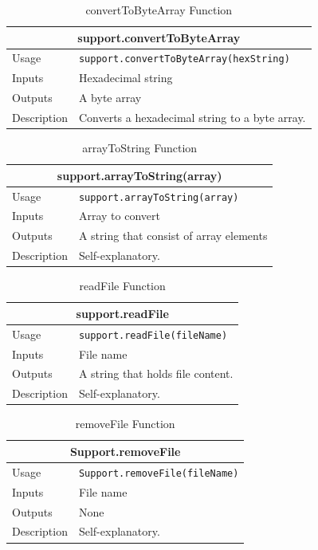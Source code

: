 \documentclass{llncs}
\numberwithin{algorithm}{chapter}
\begin{document}
\begin{table}[H]
\caption{convertToByteArray Function}
\begin{tabular}{ |p{2cm}||p{11cm}|  }
 \hline
 \multicolumn{2}{|c|}{\cellcolor{teal}\textbf{support.convertToByteArray}} \\
 \hline
 Usage & \texttt{support.convertToByteArray(hexString)}\\ \hline
 Inputs & Hexadecimal string \\ \hline
 Outputs &  A byte array \\ \hline
 Description & Converts a hexadecimal string to a byte array. \\ \hline
\end{tabular}
\end{table}


\begin{table}[H]
\caption{arrayToString Function}
\begin{tabular}{ |p{2cm}||p{11cm}|  }
 \hline
 \multicolumn{2}{|c|}{\cellcolor{teal}\textbf{support.arrayToString(array)}} \\
 \hline
 Usage & \texttt{support.arrayToString(array)}\\ \hline
 Inputs & Array to convert \\ \hline
 Outputs &  A string that consist of array elements \\ \hline
 Description & Self-explanatory. \\ \hline
\end{tabular}
\end{table}


\begin{table}[H]
\caption{readFile Function}
\begin{tabular}{ |p{2cm}||p{11cm}|  }
 \hline
 \multicolumn{2}{|c|}{\cellcolor{teal}\textbf{support.readFile}} \\
 \hline
 Usage & \texttt{support.readFile(fileName)}\\ \hline
 Inputs & File name \\ \hline
 Outputs &  A string that holds file content.  \\ \hline
 Description & Self-explanatory. \\ \hline
\end{tabular}
\end{table}



\begin{table}[H]
\caption{removeFile Function}
\begin{tabular}{ |p{2cm}||p{11cm}|  }
 \hline
 \multicolumn{2}{|c|}{\cellcolor{teal}\textbf{Support.removeFile}} \\
 \hline
 Usage & \texttt{Support.removeFile(fileName)} \\ \hline
 Inputs & File name \\ \hline
 Outputs &  None  \\ \hline
 Description & Self-explanatory. \\ \hline
\end{tabular}
\end{table}
\end{document}
